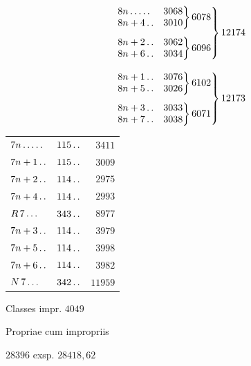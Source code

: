 \[
\begin{aligned}
&\left.\begin{gathered}
\left.\begin{array}{@{}lr@{}}8n\mathinner{.\,.\,.\,.\,.}&3068\\8n+4\mathinner{.\,.}&3010\end{array}\right\}6078\\[4pt]
\left.\begin{array}{@{}lr@{}}8n+2\mathinner{.\,.}&3062\\8n+6\mathinner{.\,.}&3034\end{array}\right\}6096
\end{gathered}\right\}12174\\[8pt]
&\left.\begin{gathered}
\left.\begin{array}{@{}lr@{}}8n+1\mathinner{.\,.}&3076\\8n+5\mathinner{.\,.}&3026\end{array}\right\}6102\\[4pt]
\left.\begin{array}{@{}lr@{}}8n+3\mathinner{.\,.}&3033\\8n+7\mathinner{.\,.}&3038\end{array}\right\}6071
\end{gathered}\right\}12173
\end{aligned}
\]
\begin{center}\begin{tabular}{@{}lrr@{}}
$7n\mathinner{.\,.\,.\,.\,.}$ & $115\mathinner{.\,.}$ & $3411$\\
$7n+1\mathinner{.\,.}$ & $115\mathinner{.\,.}$ & $3009$\\
$7n+2\mathinner{.\,.}$ & $114\mathinner{.\,.}$ & $2975$\\
$7n+4\mathinner{.\,.}$ & $114\mathinner{.\,.}$ & $2993$\\
$R\,7\mathinner{.\,.\,.}$ & $343\mathinner{.\,.}$ & $8977$\\
$7n+3\mathinner{.\,.}$ & $114\mathinner{.\,.}$ & $3979$\\
$7n+5\mathinner{.\,.}$ & $114\mathinner{.\,.}$ & $3998$\\
$7n+6\mathinner{.\,.}$ & $114\mathinner{.\,.}$ & $3982$\\
$N\,7\mathinner{.\,.\,.}$ & $342\mathinner{.\,.}$ & $11959$
\end{tabular}\end{center}
\noindent Classes impr. $4049$
\par\noindent Propriae cum impropriis
\par\noindent\quad $28396$ exsp. $28418{,}62$
